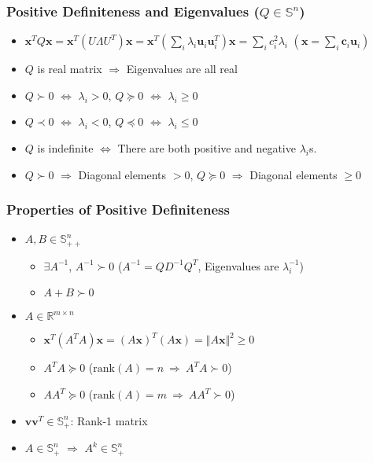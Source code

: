\subsubsection*{Positive Definiteness and Eigenvalues ($Q \in \mathbb{S}^n$)}
\begin{itemize}
    \item $\mathbf{x}^T Q\mathbf{x} = \mathbf{x}^T (U\Lambda U^T) \mathbf{x}
        = \mathbf{x}^T \left(\sum_i \lambda_i \mathbf{u}_i \mathbf{u}_i^T\right) \mathbf{x}
        = \sum_i c_i^2 \lambda_i$ $\left(\mathbf{x} = \sum_i \mathbf{c}_i \mathbf{u}_i\right)$
    \item $Q$ is real matrix $\Rightarrow$ Eigenvalues are all real
    \item $Q \succ 0$ $\Leftrightarrow$ $\lambda_i > 0$, $Q \succeq 0$ $\Leftrightarrow$ $\lambda_i \geq 0$
    \item $Q \prec 0$ $\Leftrightarrow$ $\lambda_i < 0$, $Q \preceq 0$ $\Leftrightarrow$ $\lambda_i \leq 0$
    \item $Q$ is indefinite $\Leftrightarrow$ There are both positive and negative $\lambda_i$s.
    \item $Q \succ 0$ $\Rightarrow$ Diagonal elements $> 0$, $Q \succeq 0$ $\Rightarrow$ Diagonal elements $\geq 0$
\end{itemize}

\subsubsection*{Properties of Positive Definiteness}
\begin{itemize}
    \item $A, B \in \mathbb{S}_{++}^n$
    \begin{itemize}
        \item $\exists A^{-1}$, $A^{-1} \succ 0$ ($A^{-1} = QD^{-1}Q^T$, Eigenvalues are $\lambda_i^{-1}$)
        \item $A + B \succ 0$
    \end{itemize}
    \item $A \in \mathbb{R}^{m \times n}$
    \begin{itemize}
        \item $\mathbf{x}^T\left(A^TA\right)\mathbf{x} = (A\mathbf{x})^T(A\mathbf{x}) = \Vert A\mathbf{x} \Vert^2 \geq 0$
        \item $A^TA \succeq 0$ ($\mathrm{rank}(A) = n~\Rightarrow~A^TA \succ 0$)
        \item $AA^T \succeq 0$ ($\mathrm{rank}(A) = m~\Rightarrow~AA^T \succ 0$)
    \end{itemize}
    \item $\mathbf{v}\mathbf{v}^T \in \mathbb{S}_+^n$: Rank-1 matrix
    \item $A \in \mathbb{S}_+^n$ $\Rightarrow$ $A^k \in \mathbb{S}_+^n$
\end{itemize}

